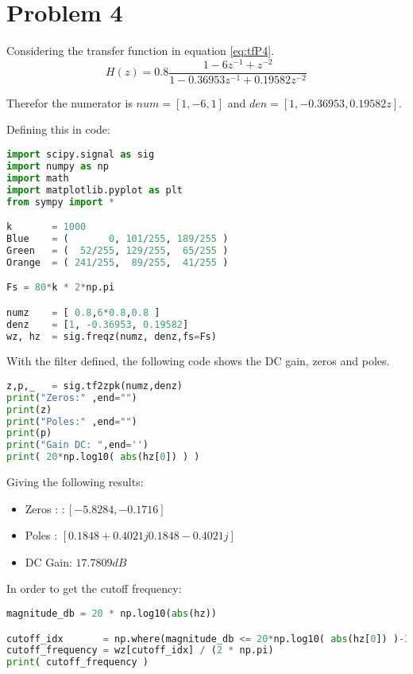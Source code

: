 \section{Problem 4}

Considering the transfer function in equation \ref{eq:tfP4}.
\begin{equation}
    \label{eq:tfP4}
    H(z)=0.8\frac{1 - 6z^{-1} + z^{-2}}{1 - 0.36953z^{-1} + 0.19582z^{-2}}
\end{equation}

Therefor the numerator is $num = [1, -6, 1]$ and $den = [1, -0.36953, 0.19582z]$.

Defining this in code:

\begin{lstlisting}[language=python, caption = Specification Definition]
import scipy.signal as sig
import numpy as np
import math
import matplotlib.pyplot as plt 
from sympy import *

k       = 1000
Blue    = (       0, 101/255, 189/255 )
Green   = (  52/255, 129/255,  65/255 )
Orange  = ( 241/255,  89/255,  41/255 )

Fs = 80*k * 2*np.pi

numz    = [ 0.8,6*0.8,0.8 ]
denz    = [1, -0.36953, 0.19582]
wz, hz  = sig.freqz(numz, denz,fs=Fs)
\end{lstlisting}

With the filter defined, the following code shows the DC gain, zeros and poles.

\begin{lstlisting}[language=python, caption = Specification Definition]
z,p,_   = sig.tf2zpk(numz,denz)
print("Zeros:" ,end="")
print(z)
print("Poles:" ,end="")
print(p)
print("Gain DC: ",end='')
print( 20*np.log10( abs(hz[0]) ) )
\end{lstlisting}

Giving the following results:
\begin{itemize}
    \item Zeros : $:[-5.8284, -0.1716]$
    \item Poles : $[0.1848+0.4021j 0.1848-0.4021j]$
    \item DC Gain: $17.7809dB$
\end{itemize}

In order to get the cutoff frequency:

\begin{lstlisting}[language=python, caption = Specification Definition]
magnitude_db = 20 * np.log10(abs(hz))

cutoff_idx       = np.where(magnitude_db <= 20*np.log10( abs(hz[0]) )-3.01)[0][0]
cutoff_frequency = wz[cutoff_idx] / (2 * np.pi) 
print( cutoff_frequency )
\end{lstlisting}

